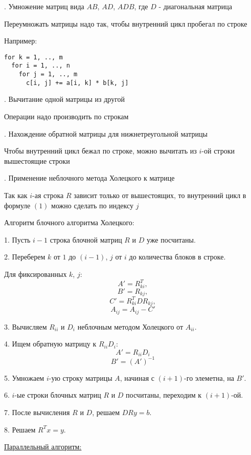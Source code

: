 \documentclass[12pt,a4paper]{article}
\begin{document}
\par\smallskip{}. Умножение матриц вида $AB$, $A D$, $A D B$, где $D$ - диагональная матрица
\par
Переумножать матрицы надо так, чтобы внутренний цикл пробегал по строке
\par
Например:
\begin{verbatim}
for k = 1, .., m
  for i = 1, .., n
    for j = 1, .., m
      c[i, j] += a[i, k] * b[k, j]
\end{verbatim}

\par\smallskip{}. Вычитание одной матрицы из другой
\par
Операции надо производить по строкам

\par\smallskip{}. Нахождение обратной матрицы для нижнетреугольной матрицы
\par
Чтобы внутренний цикл бежал по строке, можно вычитать из $i$-ой строки вышестоящие строки

\par\smallskip{}. Применение неблочного метода Холецкого к матрице
\par
Так как $i$-ая строка $R$ зависит только от вышестоящих, то внутренний цикл в формуле $(1)$ можно сделать по индексу $j$

\par\bigskip\noindent
Алгоритм блочного алгоритма Холецкого:
\par
1. Пусть $i-1$ строка блочной матриц $R$ и $D$ уже посчитаны. 
\par
2. Переберем $k$ от $1$ до $(i-1)$, $j$ от $i$ до количества блоков в строке.
\par
Для фиксированных $k$, $j$:
$$A' = R^T_{ki},$$ 
$$B' = R_{kj},$$ 
$$C' = R^T_{ki} D R_{kj},$$
$$A_{ij} = A_{ij} - C'$$
\par
3. Вычисляем $R_{ii}$ и $D_{i}$ неблочным методом Холецкого от $A_{ii}$.
\par
4. Ищем обратную матрицу к $R_{ii} D_i$: 
$$A' = R_{ii} D_i$$
$$B' = (A')^{-1}$$
\par
5. Умножаем $i$-ую строку матрицы $A$, начиная с $(i+1)$-го элеметна, на $B'$.
\par
6. $i$-ые строки блочных матриц $R$ и $D$ посчитаны, переходим к $(i+1)$-ой.
\par
7. После вычисления $R$ и $D$, решаем $D R y = b$.
\par
8. Решаем $R^T x = y$.

\par\bigskip
\noindent\underline{Параллельный алгоритм:}
\end{document}

